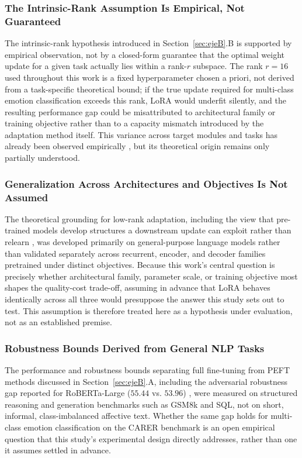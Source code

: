 \documentclass[conference]{IEEEtran}
\begin{document}
\subsubsection{The Intrinsic-Rank Assumption Is Empirical, Not Guaranteed}
The intrinsic-rank hypothesis introduced in Section~\ref{sec:ejeB}.B is supported by empirical observation, not by a closed-form guarantee that the optimal weight update for a given task actually lies within a rank-$r$ subspace. The rank $r=16$ used throughout this work is a fixed hyperparameter chosen a priori, not derived from a task-specific theoretical bound; if the true update required for multi-class emotion classification exceeds this rank, LoRA would underfit silently, and the resulting performance gap could be misattributed to architectural family or training objective rather than to a capacity mismatch introduced by the adaptation method itself. This variance across target modules and tasks has already been observed empirically \cite{nwaiwu2025peft}, but its theoretical origin remains only partially understood.

\subsubsection{Generalization Across Architectures and Objectives Is Not Assumed}
The theoretical grounding for low-rank adaptation, including the view that pre-trained models develop structures a downstream update can exploit rather than relearn \cite{teehan2022emergent}, was developed primarily on general-purpose language models rather than validated separately across recurrent, encoder, and decoder families pretrained under distinct objectives. Because this work's central question is precisely whether architectural family, parameter scale, or training objective most shapes the quality-cost trade-off, assuming in advance that LoRA behaves identically across all three would presuppose the answer this study sets out to test. This assumption is therefore treated here as a hypothesis under evaluation, not as an established premise.

\subsubsection{Robustness Bounds Derived from General NLP Tasks}
The performance and robustness bounds separating full fine-tuning from PEFT methods discussed in Section~\ref{sec:ejeB}.A, including the adversarial robustness gap reported for RoBERTa-Large ($55.44$ vs. $53.96$) \cite{liu-etal-2026-look}, were measured on structured reasoning and generation benchmarks such as GSM8k and SQL, not on short, informal, class-imbalanced affective text. Whether the same gap holds for multi-class emotion classification on the CARER benchmark is an open empirical question that this study's experimental design directly addresses, rather than one it assumes settled in advance.
\end{document}
